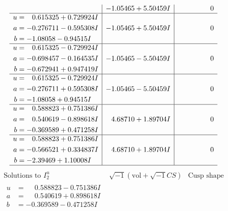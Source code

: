 \documentclass[1p]{elsarticle_modified}
\theoremstyle{definition}
\newcommand{\I}{\sqrt{-1}}
\begin{document}
$$\begin{array}{c|c|c}
 & -1.05465 + 5.50459 I & \phantom{-0.000000 } 0 \\ \hline\begin{aligned}
u &= \phantom{-}0.615325 + 0.729924 I \\
a &= -0.276711 - 0.595308 I \\
b &= -1.08058 - 0.94515 I\end{aligned}
 & -1.05465 + 5.50459 I & \phantom{-0.000000 } 0 \\ \hline\begin{aligned}
u &= \phantom{-}0.615325 - 0.729924 I \\
a &= -0.698457 - 0.164535 I \\
b &= -0.672941 + 0.947419 I\end{aligned}
 & -1.05465 - 5.50459 I & \phantom{-0.000000 } 0 \\ \hline\begin{aligned}
u &= \phantom{-}0.615325 - 0.729924 I \\
a &= -0.276711 + 0.595308 I \\
b &= -1.08058 + 0.94515 I\end{aligned}
 & -1.05465 - 5.50459 I & \phantom{-0.000000 } 0 \\ \hline\begin{aligned}
u &= \phantom{-}0.588823 + 0.751386 I \\
a &= \phantom{-}0.540619 - 0.898618 I \\
b &= -0.369589 + 0.471258 I\end{aligned}
 & \phantom{-}4.68710 + 1.89704 I & \phantom{-0.000000 } 0 \\ \hline\begin{aligned}
u &= \phantom{-}0.588823 + 0.751386 I \\
a &= -0.566521 + 0.334837 I \\
b &= -2.39469 + 1.10008 I\end{aligned}
 & \phantom{-}4.68710 + 1.89704 I & \phantom{-0.000000 } 0\\
 \hline 
 \end{array}$$\newpage$$\begin{array}{c|c|c}  
\text{Solutions to }I^u_{2}& \I (\text{vol} + \sqrt{-1}CS) & \text{Cusp shape}\\
 \hline 
\begin{aligned}
u &= \phantom{-}0.588823 - 0.751386 I \\
a &= \phantom{-}0.540619 + 0.898618 I \\
b &= -0.369589 - 0.471258 I\end{aligned}

\end{array}$$
\end{document}
